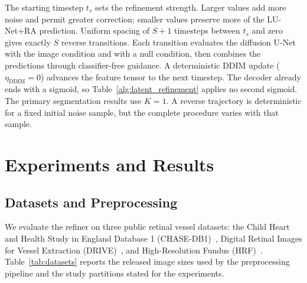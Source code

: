 \documentclass[jimaging,article,submit,pdftex,moreauthors]{Definitions/mdpi}%
\begin{document}
The starting timestep $t_s$ sets the refinement strength. Larger values add more noise and permit greater correction; smaller values preserve more of the LU-Net+RA prediction. Uniform spacing of $S+1$ timesteps between $t_s$ and zero gives exactly $S$ reverse transitions. Each transition evaluates the diffusion U-Net with the image condition and with a null condition, then combines the predictions through classifier-free guidance. A deterministic DDIM update ($\eta_{\mathrm{DDIM}}=0$) advances the feature tensor to the next timestep. The decoder already ends with a sigmoid, so Table~\ref{alg:latent_refinement} applies no second sigmoid. The primary segmentation results use $K=1$. A reverse trajectory is deterministic for a fixed initial noise sample, but the complete procedure varies with that sample.







\section{Experiments and Results}

\label{sec:experiments_results}



\subsection{Datasets and Preprocessing}



We evaluate the refiner on three public retinal vessel datasets: the Child Heart and Health Study in England Database 1 (CHASE-DB1)~\cite{CHASEDB1}, Digital Retinal Images for Vessel Extraction (DRIVE)~\cite{Staal2004}, and High-Resolution Fundus (HRF)~\cite{Odstrcilik2013HRF}. Table~\ref{tab:datasets} reports the released image sizes used by the preprocessing pipeline and the study partitions stated for the experiments.
\end{document}

